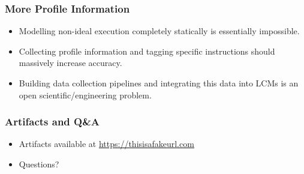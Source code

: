 \documentclass[light]{ucdbeamer}
\begin{document}
\begin{frame}[plain]
\frametitle{More Profile Information}
\begin{itemize}
  \item Modelling non-ideal execution completely statically is essentially impossible.
  \item Collecting profile information and tagging specific instructions should massively increase accuracy.
  \item Building data collection pipelines and integrating this data into LCMs is an open scientific/engineering problem.
\end{itemize}
\end{frame}

\begin{frame}[plain]
\frametitle{Artifacts and Q\&A}
\begin{itemize}
  \item Artifacts available at \url{https://thisisafakeurl.com}
  \item Questions?
\end{itemize}
\end{frame}
\end{document}
